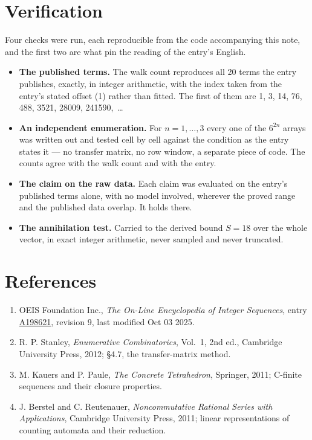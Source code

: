 \documentclass[11pt]{article}
\theoremstyle{definition}
\begin{document}
\section{Verification}

Four checks were run, each reproducible from the code accompanying this note, and the first two are what pin the reading of the entry's English.

\begin{itemize}

\item {\bfseries The published terms.} The walk count reproduces all 20 terms the entry publishes, exactly, in integer arithmetic, with the index taken from the entry's stated offset (1) rather than fitted. The first of them are 1, 3, 14, 76, 488, 3521, 28009, 241590,~\dots

\item {\bfseries An independent enumeration.} For $n = 1,\dots,3$ every one of the $6^{2n}$ arrays was written out and tested cell by cell against the condition as the entry states it --- no transfer matrix, no row window, a separate piece of code. The counts agree with the walk count and with the entry.

\item {\bfseries The claim on the raw data.} Each claim was evaluated on the entry's published terms alone, with no model involved, wherever the proved range and the published data overlap. It holds there.

\item {\bfseries The annihilation test.} Carried to the derived bound $S = 18$ over the whole vector, in exact integer arithmetic, never sampled and never truncated.

\end{itemize}

\section{References}

\begin{enumerate}

\item OEIS Foundation Inc., \emph{The On-Line Encyclopedia of Integer Sequences}, entry \href{https://oeis.org/A198621}{A198621}, revision 9, last modified Oct 03 2025.

\item R. P. Stanley, \emph{Enumerative Combinatorics}, Vol.~1, 2nd ed., Cambridge University Press, 2012; \S4.7, the transfer-matrix method.

\item M. Kauers and P. Paule, \emph{The Concrete Tetrahedron}, Springer, 2011; C-finite sequences and their closure properties.

\item J. Berstel and C. Reutenauer, \emph{Noncommutative Rational Series with Applications}, Cambridge University Press, 2011; linear representations of counting automata and their reduction.

\end{enumerate}
\end{document}
